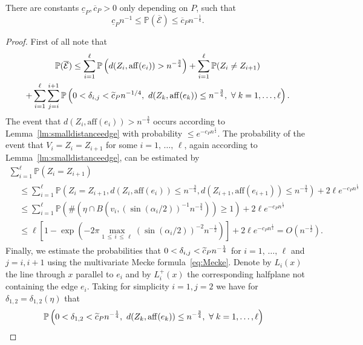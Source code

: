 \documentclass[10pt]{amsart}
\theoremstyle{definition}\newtheorem{defi}[theo]{Definition}\newtheorem{rema}[theo]{Remark}\newtheorem{exam}[theo]{Example}\newtheorem{exem}[theo]{Example}\newtheorem{nota}[theo]{Notation}
\newcommand{\bbP}{\mathbb{P}}
\newcommand{\clE}{\mathcal{E}}
\newcommand{\aff}{\mathrm{aff}}
\let\oldtilde\tilde
\renewcommand*{\tilde}[1]{\mathchoice{\widetilde{#1}}{\widetilde{#1}}{\oldtilde{#1}}{\oldtilde{#1}}}
\let\oldforall\forall
\renewcommand*{\forall}{\mathrel{\oldforall}}
\begin{document}
\begin{coro}\label{cor:complcE}
There are constants $\underline c_P, \overline c_P>0$ only depending on $P$, such that
\[
\underline c_Pn^{- 1}\leq \bbP(\overline{\clE})\leq \overline c_P n^{-\frac 14}.
\]
\end{coro}

\begin{proof}
First of all note that
\begin{multline}\label{eq:19.04.23_1}
\bbP(\overline{\clE})\leq \sum_{i=1}^\ell \bbP\left(d(Z_i, \aff(e_i)) > n^{- \frac 34}\right)+ \sum_{i=1}^\ell \bbP(Z_i\neq Z_{i+1})\\
+ \sum_{i=1}^\ell \sum_{j=i}^{i+1} \bbP\left(0<\delta_{i,j}<\tilde c_P n^{-1/4}, \ d(Z_k, \aff(e_k)) \leq n^{- \frac 34},\ \forall k=1,\ldots,\ell\right).
\end{multline}
The event that $d(Z_i, \aff(e_i)) > n^{- \frac 34}$ occurs according to Lemma~\ref{lm:smalldistanceedge} with probability $\leq e^{- c_P n^{ \frac 14} }$. The probability of the event that $V_i=Z_i=Z_{i+1}$ for some $i=1,\,\ldots,\,\ell$, again according to Lemma~\ref{lm:smalldistanceedge}, can be estimated by
\begin{multline*}
\sum_{i=1}^\ell\bbP(Z_i=Z_{i+1})
\\
\begin{aligned}
& \leq
\sum_{i=1}^\ell \bbP\left(Z_i=Z_{i+1}, d(Z_i, \aff(e_i)) \leq n^{- \frac 34}, d(Z_{i+1}, \aff(e_{i+1})) \leq n^{- \frac 34}\right) + 2\ell e^{- c_P n^{\frac 14}}
\\ & \leq
\sum_{i=1}^\ell \bbP\left(\#\left(\eta \cap B\left(v_i,(\sin(\alpha_i/2))^{-1}n^{- \frac 34}\right)\right) \geq 1\right) + 2\ell e^{- c_P n^{\frac 14}}
\\ & \leq
\ell \left[1-\exp\left(-2 \pi\max_{1\,\leq\,i\,\leq\,\ell}(\sin(\alpha_i/2))^{-2} n^{- \frac 12} \right)\right] + 2\ell e^{- c_P n^{\frac 14}} = O\left(n^{- \frac 12}\right).
\end{aligned}
\end{multline*}
Finally, we estimate the probabilities that $0<\delta_{i,j} < \tilde c_P n^{- \frac 14}$ for $i=1,\,\ldots,\,\ell$ and $j=i,i+1$ using the multivariate Mecke formula~\eqref{eq:Mecke}. Denote by $L_i(x)$ the line through $x$ parallel to $e_i$ and by $L_i^+(x)$ the corresponding halfplane not containing the edge $e_i$. Taking for simplicity $i=1, j=2$ we have for $\delta_{1,2}=\delta_{1,2}(\eta)$ that
\begin{align*}
&\bbP \left(0<\delta_{1,2} < \tilde c_P n^{- \frac 14}, \ d(Z_k, \aff(e_k)) \leq n^{- \frac 34},\ \forall k=1,\ldots,\ell \right)

\end{align*}
\end{proof}
\end{document}
